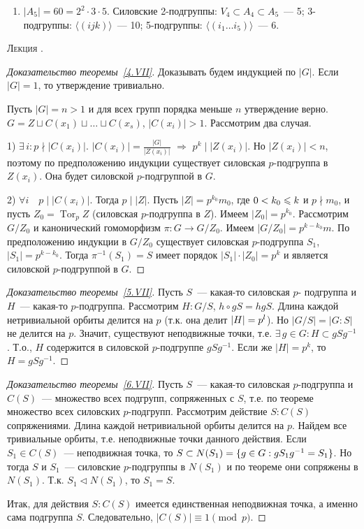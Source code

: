 \documentclass[a4paper]{article}
\newcounter{lec}
\renewcommand{\thelec}{\Roman{lec}}
\newcommand*{\lecture}[1]{\refstepcounter{lec}\vspace{20pt}
\begin{center}{\rmfamily\textsc{Лекция \thelec. \\ \textbf{#1}}}\vspace{5pt}
\end{center}}
\newcommand{\Tor}{\mathop{\mathrm{Tor}}\nolimits}
\newcommand*{\p}[1]{#1\nobreak\discretionary{}{\hbox{$\mathsurround=0pt #1$}}{}}
\begin{document}
\prim
\begin{enumerate}
  \item $|A_5|=60=2^2\cdot3\cdot5$. Силовские 2-подгруппы: $V_4\subset A_4\subset
  A_5$~--- 5; 3-подгруппы: $\langle(ijk)\rangle$~--- 10;
  5-подгруппы: $\langle(i_1\ldots i_5)\rangle$~--- 6.
\end{enumerate}
\lecture{}

\begin{proof}[Доказательство теоремы~\ref{4.VII}]
Доказывать будем индукцией по $|G|$. Если $|G|=1$, то утверждение
тривиально.

Пусть $|G|=n>1$ и для всех групп порядка меньше $n$ утверждение
верно. $G=Z\sqcup C(x_1)\sqcup\ldots\sqcup C(x_s)$, $|C(x_i)|>1$.
Рассмотрим два случая.

1) $\exists \, i: p\nmid |C(x_i)|$. $|C(x_i)|=\frac{|G|}{|Z(x_i)|}$
$\Rightarrow$ $p^k\mid |Z(x_i)|$. Но $|Z(x_i)|<n$, поэтому по
предположению индукции существует силовская $p$-подгруппа в
$Z(x_i)$. Она будет силовской $p$-подгруппой в $G$.

2) $\forall i\quad p\mid |C(x_i)|$. Тогда $p\mid |Z|$. Пусть
$|Z|=p^{k_0}m_0$, где $0<k_0\p\leqslant k$ и $p\nmid m_0$, и пусть
$Z_0=\Tor_pZ$ (силовская $p$-подгруппа в $Z$). Имеем
$|Z_0|=p^{k_0}$. Рассмотрим $G/Z_0$ и канонический гомоморфизм
$\pi\colon G\to G/Z_0$. Имеем $|G/Z_0|=p^{k-k_0}m$. По предположению
индукции в $G/Z_0$ существует силовская $p$-подгруппа $S_1$,
$|S_1|=p^{k-k_0}$. Тогда $\pi^{-1}(S_1)=S$ имеет порядок $|S_1|\cdot
|Z_0|=p^k$ и является силовской $p$-подгруппой в $G$.
\end{proof}

\begin{proof}[Доказательство теоремы~\ref{5.VII}]
Пусть $S$~--- какая-то силовская $p$- подгруппа и $H$~--- какая-то
$p$-подгруппа. Рассмотрим $H:G/S$, $h\circ gS=hgS$. Длина каждой
нетривиальной орбиты делится на $p$ (т.к. она делит $|H|\p=p^l$). Но
$|G/S|=|G:S|$ не делится на $p$. Значит, существуют неподвижные
точки, т.е. $\exists \, g\in G: H\subset gSg^{-1}$. Т.о., $H$
содержится в силовской $p$-подгруппе $gSg^{-1}$. Если же $|H|=p^k$,
то $H=gSg^{-1}$.
\end{proof}

\begin{proof}[Доказательство теоремы~\ref{6.VII}]
Пусть $S$~--- какая-то силовская $p$-подг\-руппа и $C(S)$~---
множество всех подгрупп, сопряженных с $S$, т.е. по теореме
множество всех силовских $p$-подгрупп. Рассмотрим действие $S:C(S)$
сопряжениями. Длина каждой нетривиальной орбиты делится на $p$.
Найдем все тривиальные орбиты, т.е. неподвижные точки данного
действия. Если $S_1\in C(S)$~--- неподвижная точка, то $S\subset
N(S_1)=\{g\in G:gS_1g^{-1}\p=S_1\}$. Но тогда $S$ и $S_1$~---
силовские $p$-подгруппы в $N(S_1)$ и по теореме они сопряжены в
$N(S_1)$. Т.к. $S_1\triangleleft N(S_1)$, то $S_1=S$.

Итак, для действия $S:C(S)$ имеется единственная неподвижная точка,
а именно сама подгруппа $S$. Следовательно, $|C(S)|\equiv1\pmod{p}$.
\end{proof}
\end{document}
